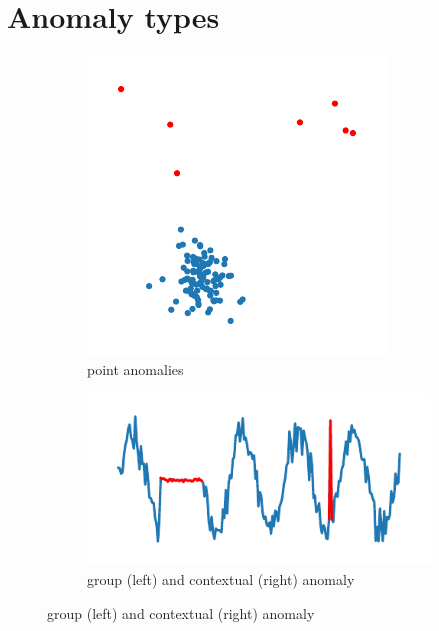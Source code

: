 \section{Anomaly types} \label{sec:anomaly_types}
\begin{figure}
\centering
\begin{subfigure}[b]{0.35\textwidth}
         \centering
         \includegraphics[width=\textwidth]{data/chapter_intro/point_anomalies.pdf}
         \caption{point anomalies}
         \label{fig:point_anomaly}
     \end{subfigure}
     \hfill
     \begin{subfigure}[b]{0.55\textwidth}
         \centering
         \includegraphics[width=\textwidth]{data/chapter_intro/group_anomalies.pdf}
         \caption{group (left) and contextual (right) anomaly}
         \label{fig:group_anomaly}
     \end{subfigure}


\end{figure}
